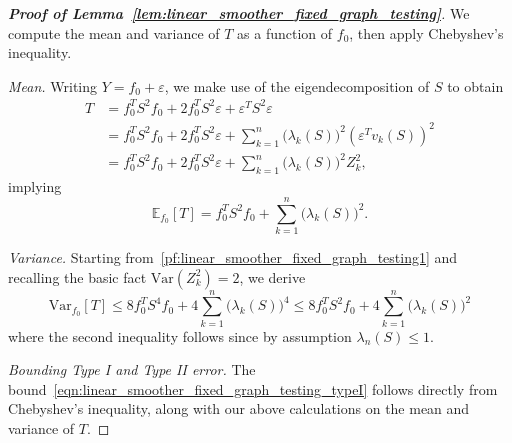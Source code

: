 \documentclass{article}
\newcommand{\Var}{\mathrm{Var}}
\newcommand{\1}{\mathbf{1}}
\newcommand{\Ebb}{\mathbb{E}}
\theoremstyle{alden}
\theoremstyle{aldenthm}
\theoremstyle{definition}
\theoremstyle{remark}
\begin{document}
\begin{proof}[\textbf{Proof of Lemma~\ref{lem:linear_smoother_fixed_graph_testing}}]
	We compute the mean and variance of $T$ as a function of $f_0$, then apply Chebyshev's inequality.
	
	\textit{Mean.} Writing $Y = f_0 + \varepsilon$, we make use of the eigendecomposition of $S$ to obtain
	\begin{equation}
	\label{pf:linear_smoother_fixed_graph_testing1}
	\begin{aligned}
	T & = f_0^T S^2 f_0 + 2 f_0^T S^2 \varepsilon + \varepsilon^T S^2 \varepsilon \\
	& = f_0^T S^2 f_0 + 2 f_0^T S^2 \varepsilon + \sum_{k = 1}^{n}  \bigl(\lambda_k(S)\bigr)^2 (\varepsilon^T v_k(S))^2 \\
	& = f_0^T S^2 f_0 + 2 f_0^T S^2 \varepsilon + \sum_{k = 1}^{n}  \bigl(\lambda_k(S)\bigr)^2 Z_k^2,
	\end{aligned}
	\end{equation}
	implying
	\begin{equation}
	\label{pf:linear_smoother_fixed_graph_testing_mean}
	\Ebb_{f_0}[T] = f_0^T S^2 f_0 + \sum_{k = 1}^{n} \bigl(\lambda_k(S)\bigr)^2.
	\end{equation}
	
	\textit{Variance.} Starting from~\eqref{pf:linear_smoother_fixed_graph_testing1} and recalling the basic fact $\Var(Z_k^2) = 2$, we derive
	\begin{equation}
	\label{pf:linear_smoother_fixed_graph_testing_var}
	\Var_{f_0}[T] \leq 8 f_0^T S^4 f_0 + 4 \sum_{k = 1}^{n} \bigl(\lambda_k(S)\bigr)^4 \leq 8 f_0^T S^2 f_0 + 4 \sum_{k = 1}^{n} \bigl(\lambda_k(S)\bigr)^2
	\end{equation}
	where the second inequality follows since by assumption $\lambda_{n}(S) \leq 1$.
	
	\textit{Bounding Type I and Type II error.} The bound~\eqref{eqn:linear_smoother_fixed_graph_testing_typeI} follows directly from Chebyshev's inequality, along with our above calculations on the mean and variance of $T$.
	

\end{proof}
\end{document}
